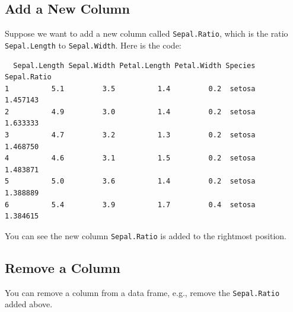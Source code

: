 \documentclass[
  letterpaper,
]{book}
\newenvironment{Shaded}{\begin{snugshade}}{\end{snugshade}}
\newcommand{\CommentTok}[1]{\textcolor[rgb]{0.37,0.37,0.37}{#1}}
\newcommand{\ConstantTok}[1]{\textcolor[rgb]{0.56,0.35,0.01}{#1}}
\newcommand{\FunctionTok}[1]{\textcolor[rgb]{0.28,0.35,0.67}{#1}}
\newcommand{\NormalTok}[1]{\textcolor[rgb]{0.00,0.23,0.31}{#1}}
\newcommand{\OtherTok}[1]{\textcolor[rgb]{0.00,0.23,0.31}{#1}}
\newcommand{\SpecialCharTok}[1]{\textcolor[rgb]{0.37,0.37,0.37}{#1}}
\begin{document}
\subsection{Add a New Column}\label{add-a-new-column}

Suppose we want to add a new column called \texttt{Sepal.Ratio}, which
is the ratio \texttt{Sepal.Length} to \texttt{Sepal.Width}. Here is the
code:

\begin{Shaded}
\end{Shaded}

\begin{verbatim}
  Sepal.Length Sepal.Width Petal.Length Petal.Width Species Sepal.Ratio
1          5.1         3.5          1.4         0.2  setosa    1.457143
2          4.9         3.0          1.4         0.2  setosa    1.633333
3          4.7         3.2          1.3         0.2  setosa    1.468750
4          4.6         3.1          1.5         0.2  setosa    1.483871
5          5.0         3.6          1.4         0.2  setosa    1.388889
6          5.4         3.9          1.7         0.4  setosa    1.384615
\end{verbatim}

You can see the new column \texttt{Sepal.Ratio} is added to the
rightmost position.

\subsection{Remove a Column}\label{remove-a-column}

You can remove a column from a data frame, e.g., remove the
\texttt{Sepal.Ratio} added above.

\begin{Shaded}
\end{Shaded}
\end{document}
